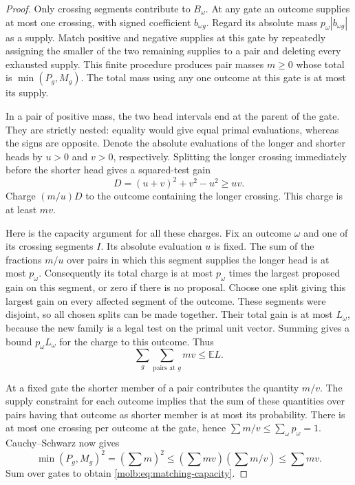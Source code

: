 \begin{proof}
Only crossing segments contribute to \(B_\omega\).  At any gate an
outcome supplies at most one crossing, with signed coefficient
\(b_{\omega g}\).  Regard its absolute mass
\(p_\omega|b_{\omega g}|\) as a supply.  Match positive and negative
supplies at this gate by repeatedly assigning the smaller of the two
remaining supplies to a pair and deleting every exhausted supply.  This
finite procedure produces pair masses \(m\ge0\) whose total is
\(\min(P_g,M_g)\).  The total mass using any one outcome at this gate
is at most its supply.

In a pair of positive mass, the two head intervals end at the parent of
the gate.  They are strictly nested: equality would give equal primal
evaluations, whereas the signs are opposite.  Denote the absolute
evaluations of the longer and shorter heads by \(u>0\) and \(v>0\),
respectively.  Splitting the longer crossing immediately before the
shorter head gives a squared-test gain
\[
 D=(u+v)^2+v^2-u^2\ge uv.
\]
Charge \((m/u)D\) to the outcome containing the longer crossing.  This
charge is at least \(mv\).

Here is the capacity argument for all these charges.  Fix an outcome
\(\omega\) and one of its crossing segments \(I\).  Its absolute
evaluation \(u\) is fixed.  The sum of the fractions \(m/u\) over pairs
in which this segment supplies the longer head is at most \(p_\omega\).
Consequently its total charge is at most \(p_\omega\) times the largest
proposed gain on this segment, or zero if there is no proposal.  Choose
one split giving this largest gain on every affected segment of the
outcome.  These segments were disjoint, so all chosen splits can be made
together.  Their total gain is at most \(L_\omega\), because the new
family is a legal test on the primal unit vector.  Summing gives a bound
\(p_\omega L_\omega\) for the charge to this outcome.  Thus
\[
 \sum_{g}\sum_{\text{pairs at }g}mv\le\mathbb E L.
\]

At a fixed gate the shorter member of a pair contributes the quantity
\(m/v\).  The supply constraint for each outcome implies that the sum
of these quantities over pairs having that outcome as shorter member is
at most its probability.  There is at most one crossing per outcome at
the gate, hence \(\sum m/v\le\sum_\omega p_\omega=1\).
Cauchy--Schwarz now gives
\[
 \min(P_g,M_g)^2=(\sum m)^2
       \le(\sum mv)(\sum m/v)\le\sum mv.
\]
Sum over gates to obtain \eqref{molb:eq:matching-capacity}.
\end{proof}

